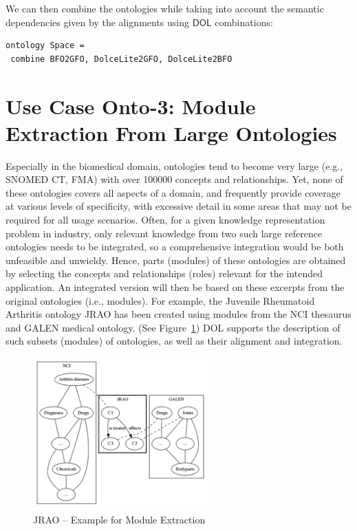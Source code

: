 \documentclass[10pt,fleqn,%
\ifpretendfinal
final%
\else
draft%
\fi,
]{scrreprt}
\newcommand*{\DOL}{\ensuremath{\mathsf{DOL}}\xspace}
\newcommand{\figurerefname}{Figure}
\newcommand{\fref}[1]{\figurerefname~\ref{#1}}
\begin{document}
We can then combine the ontologies while taking into account the semantic dependencies given by the alignments using
\DOL combinations:

\begin{lstlisting}[basicstyle=\ttfamily\footnotesize,language=dolText,morekeywords={props,ObjectProperty,Class,DisjointUnionOf,SubClassOf,Characteristics,Transitive,Asymmetric,SubPropertyOf,DisjointClasses,EquivalentTo,inverse,only,forall,iff,if,or,exists,distributed,from},escapechar=@,mathescape]
ontology Space =
 combine BFO2GFO, DolceLite2GFO, DolceLite2BFO
\end{lstlisting} 

\section{Use Case Onto-3: Module Extraction From Large Ontologies}
Especially in the biomedical domain, ontologies tend to become very large (e.g., SNOMED CT, FMA) 
with over 100000 concepts and relationships. Yet, none of these ontologies covers all aspects of a 
domain, and frequently provide coverage at various levels of specificity, with excessive detail in 
some areas that may not be required for all usage scenarios. Often, for a given knowledge 
representation problem in industry, only relevant knowledge from two such large reference 
ontologies needs to be integrated, so a comprehensive integration would be both unfeasible and 
unwieldy. Hence, parts (modules) of these ontologies are obtained by selecting the concepts and 
relationships (roles) relevant for the intended application. An integrated version will then be 
based on these excerpts from the original ontologies (i.e., modules). For example, the Juvenile 
Rheumatoid Arthritis ontology JRAO has been created using modules from the NCI thesaurus and GALEN 
medical ontology. (See \fref{JRAO}) DOL  
supports the description of such subsets (modules) of ontologies, as well as their alignment and 
integration.


\begin{figure}[htbp]
\begin{center}
\includegraphics[width=0.6\textwidth]{useCaseOnto3.png}
\caption{JRAO  -- Example for Module Extraction}
\label{JRAO}
\end{center}
\end{figure}
\end{document}
